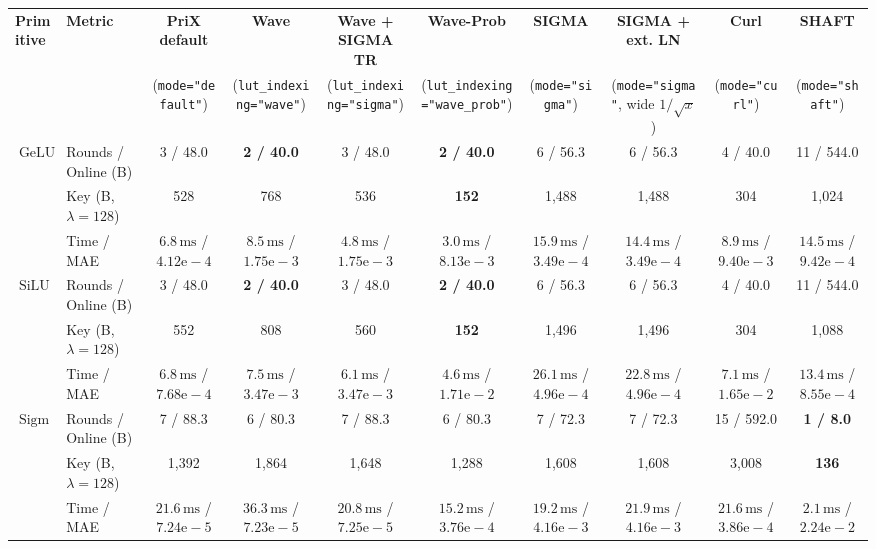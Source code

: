 \begin{tabular}{@{}llcccccccc@{}}
\toprule
\textbf{Primitive} & \textbf{Metric} & \textbf{PriX default} & \textbf{Wave} & \textbf{Wave + SIGMA TR} & \textbf{Wave-Prob} & \textbf{SIGMA} & \textbf{SIGMA + ext. LN} & \textbf{Curl} & \textbf{SHAFT} \\
 & & (\texttt{mode="default"}) & (\texttt{lut\_indexing="wave"}) & (\texttt{lut\_indexing="sigma"}) & (\texttt{lut\_indexing="wave\_prob"}) & (\texttt{mode="sigma"}) & (\texttt{mode="sigma"}, wide $1/\sqrt{x}$) & (\texttt{mode="curl"}) & (\texttt{mode="shaft"}) \\
\midrule
\multirow{3}{*}{$\operatorname{GeLU}$}
 & Rounds / Online (B) & 3 / 48.0 & \textbf{2 / 40.0} & 3 / 48.0 & \textbf{2 / 40.0} & 6 / 56.3 & 6 / 56.3 & 4 / 40.0 & 11 / 544.0 \\
 & Key (B, $\lambda{=}128$) & 528 & 768 & 536 & \textbf{152} & 1,488 & 1,488 & 304 & 1,024 \\
 & Time / MAE & $6.8\,\text{ms}$ / $4.12\text{e}-4$ & $8.5\,\text{ms}$ / $1.75\text{e}-3$ & $4.8\,\text{ms}$ / $1.75\text{e}-3$ & $3.0\,\text{ms}$ / $8.13\text{e}-3$ & $15.9\,\text{ms}$ / $3.49\text{e}-4$ & $14.4\,\text{ms}$ / $3.49\text{e}-4$ & $8.9\,\text{ms}$ / $9.40\text{e}-3$ & $14.5\,\text{ms}$ / $9.42\text{e}-4$ \\
\midrule
\multirow{3}{*}{$\operatorname{SiLU}$}
 & Rounds / Online (B) & 3 / 48.0 & \textbf{2 / 40.0} & 3 / 48.0 & \textbf{2 / 40.0} & 6 / 56.3 & 6 / 56.3 & 4 / 40.0 & 11 / 544.0 \\
 & Key (B, $\lambda{=}128$) & 552 & 808 & 560 & \textbf{152} & 1,496 & 1,496 & 304 & 1,088 \\
 & Time / MAE & $6.8\,\text{ms}$ / $7.68\text{e}-4$ & $7.5\,\text{ms}$ / $3.47\text{e}-3$ & $6.1\,\text{ms}$ / $3.47\text{e}-3$ & $4.6\,\text{ms}$ / $1.71\text{e}-2$ & $26.1\,\text{ms}$ / $4.96\text{e}-4$ & $22.8\,\text{ms}$ / $4.96\text{e}-4$ & $7.1\,\text{ms}$ / $1.65\text{e}-2$ & $13.4\,\text{ms}$ / $8.55\text{e}-4$ \\
\midrule
\multirow{3}{*}{$\operatorname{Sigmoid}$}
 & Rounds / Online (B) & 7 / 88.3 & 6 / 80.3 & 7 / 88.3 & 6 / 80.3 & 7 / 72.3 & 7 / 72.3 & 15 / 592.0 & \textbf{1 / 8.0} \\
 & Key (B, $\lambda{=}128$) & 1,392 & 1,864 & 1,648 & 1,288 & 1,608 & 1,608 & 3,008 & \textbf{136} \\
 & Time / MAE & $21.6\,\text{ms}$ / $7.24\text{e}-5$ & $36.3\,\text{ms}$ / $7.23\text{e}-5$ & $20.8\,\text{ms}$ / $7.25\text{e}-5$ & $15.2\,\text{ms}$ / $3.76\text{e}-4$ & $19.2\,\text{ms}$ / $4.16\text{e}-3$ & $21.9\,\text{ms}$ / $4.16\text{e}-3$ & $21.6\,\text{ms}$ / $3.86\text{e}-4$ & $2.1\,\text{ms}$ / $2.24\text{e}-2$ \\

\end{tabular}
